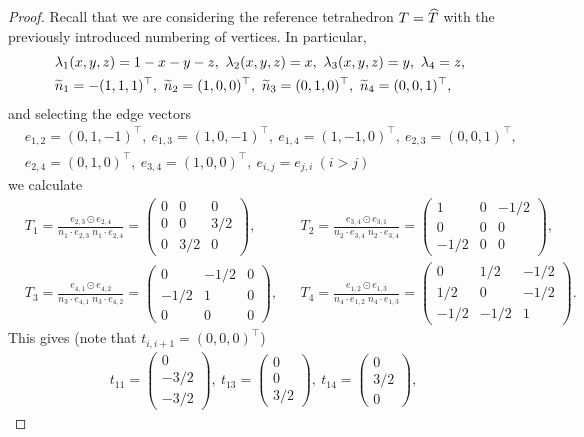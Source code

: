 \documentclass[11pt]{article}
\begin{document}
\begin{proof}
Recall that we are considering the reference tetrahedron $T={\widehat T}$
with the previously introduced numbering of vertices.
In particular,
\begin{align*}
   &\lambda_1(x,y,z)=1-x-y-z,\ \lambda_2(x,y,z)=x,\ \lambda_3(x,y,z)=y,\ \lambda_4=z,\\
   &\wtilde n_1=-(1,1,1)^\top,\ \wtilde n_2=(1,0,0)^\top,\ \wtilde n_3=(0,1,0)^\top,\ \wtilde n_4=(0,0,1)^\top,
\end{align*}
and selecting the edge vectors
\begin{align*}
   &e_{1,2}=(0,1,-1)^\top,\ e_{1,3}=(1,0,-1)^\top,\ e_{1,4}=(1,-1,0)^\top,\ e_{2,3}=(0,0,1)^\top,\\
   &e_{2,4}=(0,1,0)^\top,\ e_{3,4}=(1,0,0)^\top,\ e_{i,j}=e_{j,i}\ (i>j)
\end{align*} 
we calculate
\begin{align*}
   &T_1=\frac{e_{2,3}\odot e_{2,4}}{n_1\cdot e_{2,3}\; n_1\cdot e_{2,4}}
   = \begin{pmatrix} 0 & 0 & 0\\ 0 & 0 & 3/2\\ 0 & 3/2 & 0 \end{pmatrix},
   &&T_2=\frac{e_{3,4}\odot e_{3,1}}{n_2\cdot e_{3,4}\; n_2\cdot e_{3,4}}
   = \begin{pmatrix} 1 & 0 & -1/2\\ 0 & 0 & 0\\ -1/2 & 0 & 0 \end{pmatrix},\\
   &T_3=\frac{e_{4,1}\odot e_{4,2}}{n_3\cdot e_{4,1}\; n_3\cdot e_{4,2}}
   = \begin{pmatrix} 0 & -1/2 & 0\\ -1/2 & 1 & 0\\ 0 & 0 & 0 \end{pmatrix},
   &&T_4=\frac{e_{1,2}\odot e_{1,3}}{n_4\cdot e_{1,2}\; n_4\cdot e_{1,3}}
   = \begin{pmatrix} 0 & 1/2 & -1/2\\ 1/2 & 0 & -1/2\\ -1/2 & -1/2 & 1 \end{pmatrix}.
\end{align*}
This gives (note that $t_{i,i+1}=(0,0,0)^\top$)
\newcommand{\mvec}[3]{\begin{pmatrix}#1\\#2\\#3\end{pmatrix}}
\begin{align*}
   &t_{11}=\mvec{0}{-3/2}{-3/2},\ t_{13}=\mvec{0}{0}{3/2},\ t_{14}=\mvec{0}{3/2}{0},\

\end{align*}
\end{proof}
\end{document}
